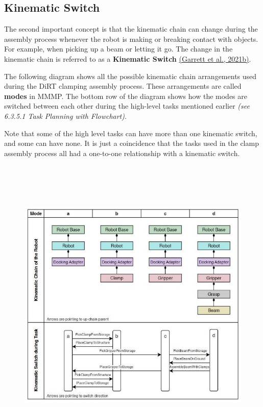 \documentclass[11pt]{book}
\begin{document}
\subsection{Kinematic Switch}

The second important concept is that the kinematic chain can change during the assembly process whenever the robot is making or breaking contact with objects. For example, when picking up a beam or letting it go. The change in the kinematic chain is referred to as a \textbf{Kinematic Switch} \href{https://www.zotero.org/google-docs/?QSVbB7}{(Garrett et al., 2021b)}. 

The following diagram shows all the possible kinematic chain arrangements used during the DiRT clamping assembly process. These arrangements are called \textbf{modes }in MMMP. The bottom row of the diagram shows how the modes are switched between each other during the high-level tasks mentioned earlier \textit{\textcolor[HTML]{B7B7B7}{(see 6.3.5.1 Task Planning with Flowchart)}}. 

Note that some of the high level tasks can have more than one kinematic switch, and some can have none. It is just a coincidence that the tasks used in the clamp assembly process all had a one-to-one relationship with a kinematic switch. 

\begin{figure}[H]
\includegraphics[width=15.92cm,height=14.46cm]{./images/image32.jpeg}
\end{figure}
\end{document}

